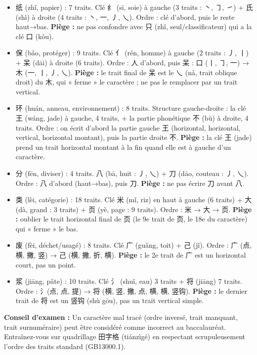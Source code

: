 \documentclass[11pt]{article}
\newcommand{\cle}[1]{{\popxbold\color{popdark}#1}}
\begin{document}
\begin{attention}
\begin{itemize}
\item \cle{纸} (zhǐ, papier) : 7 traits. Clé \cle{纟} (sī, soie) à gauche (3 traits : 丶, ㇆, ㇀) + \cle{氏} (shì) à droite (4 traits : 丶, 一, 丿, 乀). Ordre : clé d'abord, puis le reste haut→bas. \textbf{Piège :} ne pas confondre avec \cle{只} (zhǐ, seul/classificateur) qui a la clé \cle{口} (kǒu).
\item \cle{保} (bǎo, protéger) : 9 traits. Clé \cle{亻} (rén, homme) à gauche (2 traits : 丿, 丨) + \cle{呆} (dāi) à droite (6 traits). Ordre : 人 d'abord, puis 呆 : 口 (丨, ㇆, 一) → 木 (一, 丨, 丿, 乀). \textbf{Piège :} le trait final de 呆 est le \cle{乀} (nà, trait oblique droit) du 木, qui « ferme » le caractère ; ne pas le remplacer par un trait vertical.
\item \cle{环} (huán, anneau, environnement) : 8 traits. Structure gauche-droite : la clé \cle{王} (wáng, jade) à gauche, 4 traits, + la partie phonétique \cle{不} (bù) à droite, 4 traits. Ordre : on écrit d'abord la partie gauche \cle{王} (horizontal, horizontal, vertical, horizontal montant), puis la partie droite \cle{不}. \textbf{Piège :} la clé \cle{王} (jade) prend un trait horizontal montant à la fin quand elle est à gauche d'un caractère.
\item \cle{分} (fēn, diviser) : 4 traits. \cle{八} (bā, huit : 丿, 乀) + \cle{刀} (dāo, couteau : 丿, 乀). Ordre : 八 d'abord (haut→bas), puis 刀. \textbf{Piège :} ne pas écrire 刀 avant 八.
\item \cle{类} (lèi, catégorie) : 18 traits. Clé \cle{米} (mǐ, riz) en haut à gauche (6 traits) + \cle{大} (dà, grand : 3 traits) + \cle{页} (yè, page : 9 traits). Ordre : 米 → 大 → 页. \textbf{Piège :} oublier le trait horizontal final de 页 (le 9e trait de 页, le 18e du caractère) qui « ferme » le bas.
\item \cle{废} (fèi, déchet/usagé) : 8 traits. Clé \cle{广} (guǎng, toit) + \cle{己} (jǐ). Ordre : 广 (点, 横, 撇, 竖) → 己 (横, 撇, 折, 横). \textbf{Piège :} le 2e trait de 广 est un horizontal court, pas un point.
\item \cle{浆} (jiāng, pâte) : 10 traits. Clé \cle{氵} (shuǐ, eau) 3 traits + \cle{将} (jiāng) 7 traits. Ordre : 氵(点, 点, 提) → 将 (横, 竖, 撇, 点, 横, 横, 竖钩). \textbf{Piège :} le dernier trait de 将 est un \cle{竖钩} (shù gōu), pas un trait vertical simple.
\end{itemize}
\textbf{Conseil d'examen :} Un caractère mal tracé (ordre inversé, trait manquant, trait surnuméraire) peut être considéré comme incorrect au baccalauréat. Entraînez-vous sur quadrillage 田字格 (tiánzìgé) en respectant scrupuleusement l'ordre des traits standard (GB13000.1).
\end{attention}
\end{document}
